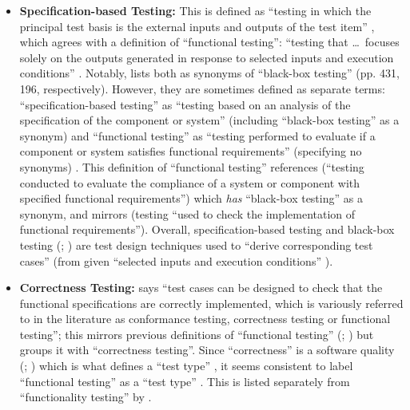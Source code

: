 \begin{itemize}
      \item \textbf{Specification-based Testing:} This is defined as ``testing
            in which the principal test basis is the external inputs and
            outputs of the test item'' \citep[p.~9]{IEEE2022}, which agrees
            with a definition of ``functional testing'': ``testing that
            \dots\ focuses solely on the outputs generated in response to
            selected inputs and execution conditions'' \citep[p.~196]{IEEE2017}.
            Notably, \citet{IEEE2017} lists both as synonyms of
            ``black-box testing'' (pp. 431, 196, respectively). However,
            they are sometimes defined as separate terms: ``specification-based
            testing'' as ``testing based on an analysis of the specification
            of the component or system'' (including ``black-box testing'' as a
            synonym) and ``functional testing'' as ``testing performed to
            evaluate if a component or system satisfies functional
            requirements'' (specifying no synonyms) \citepISTQB{}. This
            definition of
            ``functional testing'' references \citet[p.~196]{IEEE2017}
            (``testing conducted to evaluate the compliance of a system or
            component with specified functional requirements'') which
            \emph{has} ``black-box testing'' as a synonym, and mirrors
            \citet[p.~21]{IEEE2022} (testing ``used to check the implementation
            of functional requirements''). Overall, specification-based testing
            \citep[pp.~2-4,~6-9,~22]{IEEE2022} and black-box testing
            (\citealp[p.~5-10]{SWEBOK2024}; \citealp[p.~3]{SouzaEtAl2017})
            are test design techniques used to ``derive corresponding test cases''
            \citep[p.~11]{IEEE2022} (from given ``selected inputs and execution
            conditions'' \citep[p.~196]{IEEE2017}).

      \item \textbf{Correctness Testing:} \citet[p.~5-7]{SWEBOK2024} says
            ``test cases can be designed to check that the functional
            specifications are correctly implemented, which is variously
            referred to in the literature as conformance testing, correctness
            testing or functional testing''; this mirrors previous definitions
            of ``functional testing'' (\citealp[p.~21]{IEEE2022};
            \citeyear[p.~196]{IEEE2017}) but groups it with ``correctness
            testing''. Since ``correctness'' is a software quality
            (\citealp[p.~104]{IEEE2017}; \citealp[p.~3-13]{SWEBOK2024}) which is
            what defines a ``test type'' \citep[p.~15]{IEEE2022}, it seems
            consistent to label ``functional testing'' as a ``test type''
            \citep[pp.~15,~20,~22]{IEEE2022}. This is listed separately from
            ``functionality testing'' by \citet[p.~53]{Firesmith2015}.


\end{itemize}
